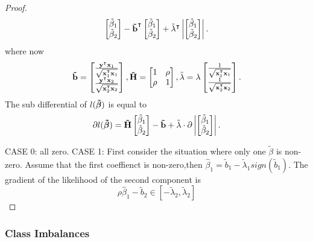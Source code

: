 \begin{proof}
\[\begin{bmatrix}
      \tilde	\beta_1 \\  \tilde\beta_2
    \end{bmatrix}
    -  {\boldsymbol{\mathrm{\tilde b}}}^\intercal \begin{bmatrix}
      \tilde	\beta_1 \\ \tilde \beta_2
    \end{bmatrix} + {\tilde \lambda}^\intercal \left| \begin{bmatrix}
      \tilde	\beta_1 \\ \tilde \beta_2
    \end{bmatrix}  \right|.
  \]
  where now
  $$
    {\boldsymbol{\mathrm{ \tilde b}}} = \begin{bmatrix}
      \frac{{\boldsymbol{\mathrm{y}}}^\intercal {\boldsymbol{\mathrm{x}}}_1}{\sqrt{{\boldsymbol{\mathrm{x}}}_1^\intercal {\boldsymbol{\mathrm{x}}}_1}} \\ \frac{{\boldsymbol{\mathrm{y}}}^\intercal {\boldsymbol{\mathrm{x}}}_2}{\sqrt{{\boldsymbol{\mathrm{x}}}_2^\intercal {\boldsymbol{\mathrm{x}}}_2}}
    \end{bmatrix} , {\boldsymbol{\mathrm{ \tilde H}}}  =
    \begin{bmatrix}
      1    & \rho \\
      \rho & 1    \\
    \end{bmatrix}, \tilde \lambda  = \lambda  \begin{bmatrix}
      \frac{1}{\sqrt{{\boldsymbol{\mathrm{x}}}_1^\intercal {\boldsymbol{\mathrm{x}}}_1}} \\ \frac{1}{\sqrt{{\boldsymbol{\mathrm{x}}}_2^\intercal {\boldsymbol{\mathrm{x}}}_2}}
    \end{bmatrix} .
  $$
  The sub differential of $ l( {\boldsymbol{\mathrm{\tilde \beta }}}) $ is equal to
  $$
    \partial l( {\boldsymbol{\mathrm{\tilde \beta }}})  = {\boldsymbol{\mathrm{ \tilde H}}} \begin{bmatrix}
      \tilde	\beta_1 \\  \tilde\beta_2
    \end{bmatrix}  -   {\boldsymbol{\mathrm{\tilde b}}}  + {\tilde \lambda} \cdot \partial \left| \begin{bmatrix}
      \tilde	\beta_1 \\ \tilde \beta_2
    \end{bmatrix}  \right|.
  $$

  CASE 0: all zero.
  CASE 1:
  First consider the situation where only one $\tilde \beta$ is non-zero. Assume that the first coeffienct is non-zero,then $\hat \beta_1 =  \tilde b_1 -  {\tilde \lambda}_1 sign( \tilde b_1 )$. The gradient of the likelihood of the second component is
  $$
    \rho \hat \beta_1  -  \tilde b_2 \in [-\tilde \lambda_2,\tilde \lambda_2 ]
  $$
\end{proof}

\subsubsection{Class Imbalances}

